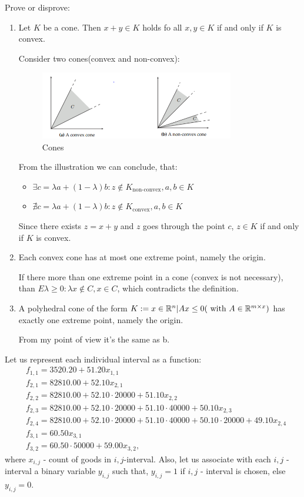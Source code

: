 \documentclass{homework}
\begin{document}
\exercise
Prove or disprove:
\begin{enumerate}[label=(\alph*)]
	\item Let $K$ be a cone. Then $x+y\in K$ holds fo all $x, y \in K$ if and only if $K$ is convex.

Consider two cones(convex and non-convex):
\begin{figure}[hbt!]
	\centering
	\includegraphics[width=0.8\textwidth]{cones.png}
	\caption{Cones}
\end{figure}

From the illustration we can conclude, that:
\begin{itemize}
	\item $\exists c=\lambda a + (1-\lambda)b: z \not\in K_{\text{non-convex}}, a,b \in K$
	\item $\nexists c=\lambda a + (1-\lambda)b: z \not\in K_{\text{convex}}, a,b \in K$
\end{itemize}
	Since there exists $z = x + y$ and $z$ goes through the point $c$, $z \in K$ if and only if $K$ is convex.
	\item Each convex cone has at most one extreme point, namely the origin.

	If there more than one extreme point in a cone (convex is not necessary), than \newline$E\lambda\geq 0: \lambda x \not\in C, x \in C$, which contradicts the definition.
	\item A polyhedral cone of the form $K:={x\in \mathbb R^n|Ax\leq 0} (\text{ with }A\in \mathbb R^{m\times x})$ has exactly one extreme point, namely the origin.

From my point of view it's the same as b.
\end{enumerate}
\exercise
Let us represent each individual interval as a function:
\begin{align*}
	&f_{1, 1} = 3520.20 + 51.20x_{1,1} \\
	&f_{2, 1} = 82810.00 + 52.10x_{2,1} \\
	&f_{2, 2} = 82810.00 + 52.10\cdot 20000 + 51.10x_{2,2} \\
	&f_{2, 3} = 82810.00 + 52.10\cdot 20000 + 51.10\cdot40000 + 50.10x_{2,3} \\
	&f_{2, 4} = 82810.00 + 52.10\cdot 20000 + 51.10\cdot40000 + 50.10\cdot20000 + 49.10x_{2,4} \\
	&f_{3, 1} = 60.50x_{3,1} \\
	&f_{3, 2} = 60.50\cdot50000 + 59.00x_{3,2}, 
\end{align*} 
where $x_{i,j}$ - count of goods in $i,j$-interval. \newline Also, let us associate with each $i,j$ - interval a binary variable $y_{i,j}$ such
that, $y_{i,j} = 1$ if $i,j$ - interval is chosen, else $y_{i,j} = 0$.
\end{document}
